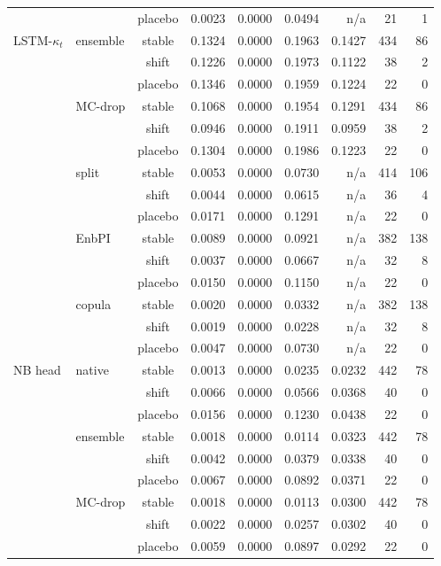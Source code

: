 {\begin{longtable}{@{}llcrrrrrr@{}}
 &  & placebo & 0.0023 & 0.0000 & 0.0494 & n/a & 21 & 1 \\
\addlinespace[2pt]
LSTM-$\kappa_t$ & ensemble & stable & 0.1324 & 0.0000 & 0.1963 & 0.1427 & 434 & 86 \\
 &  & shift & 0.1226 & 0.0000 & 0.1973 & 0.1122 & 38 & 2 \\
 &  & placebo & 0.1346 & 0.0000 & 0.1959 & 0.1224 & 22 & 0 \\
 & MC-drop & stable & 0.1068 & 0.0000 & 0.1954 & 0.1291 & 434 & 86 \\
 &  & shift & 0.0946 & 0.0000 & 0.1911 & 0.0959 & 38 & 2 \\
 &  & placebo & 0.1304 & 0.0000 & 0.1986 & 0.1223 & 22 & 0 \\
 & split & stable & 0.0053 & 0.0000 & 0.0730 & n/a & 414 & 106 \\
 &  & shift & 0.0044 & 0.0000 & 0.0615 & n/a & 36 & 4 \\
 &  & placebo & 0.0171 & 0.0000 & 0.1291 & n/a & 22 & 0 \\
 & EnbPI & stable & 0.0089 & 0.0000 & 0.0921 & n/a & 382 & 138 \\
 &  & shift & 0.0037 & 0.0000 & 0.0667 & n/a & 32 & 8 \\
 &  & placebo & 0.0150 & 0.0000 & 0.1150 & n/a & 22 & 0 \\
 & copula & stable & 0.0020 & 0.0000 & 0.0332 & n/a & 382 & 138 \\
 &  & shift & 0.0019 & 0.0000 & 0.0228 & n/a & 32 & 8 \\
 &  & placebo & 0.0047 & 0.0000 & 0.0730 & n/a & 22 & 0 \\
\addlinespace[2pt]
NB head & native & stable & 0.0013 & 0.0000 & 0.0235 & 0.0232 & 442 & 78 \\
 &  & shift & 0.0066 & 0.0000 & 0.0566 & 0.0368 & 40 & 0 \\
 &  & placebo & 0.0156 & 0.0000 & 0.1230 & 0.0438 & 22 & 0 \\
 & ensemble & stable & 0.0018 & 0.0000 & 0.0114 & 0.0323 & 442 & 78 \\
 &  & shift & 0.0042 & 0.0000 & 0.0379 & 0.0338 & 40 & 0 \\
 &  & placebo & 0.0067 & 0.0000 & 0.0892 & 0.0371 & 22 & 0 \\
 & MC-drop & stable & 0.0018 & 0.0000 & 0.0113 & 0.0300 & 442 & 78 \\
 &  & shift & 0.0022 & 0.0000 & 0.0257 & 0.0302 & 40 & 0 \\
 &  & placebo & 0.0059 & 0.0000 & 0.0897 & 0.0292 & 22 & 0 \\

\end{longtable}}
